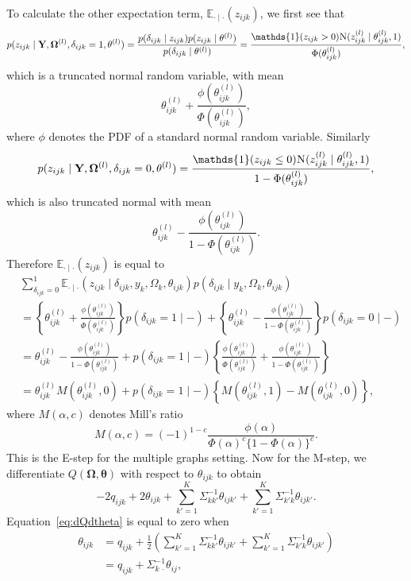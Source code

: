 \documentclass[a4paper, 11pt, oneside]{report}
\newcommand{\E}{\mathbb{E}}
\newcommand{\1}{\mathds{1}}
\newcommand{\powl}{^{(l)}}
\newcommand{\inv}{^{-1}}
\newcommand{\Nor}{\textsc{N}}
\newcommand{\bOmega}{\mathbf{\Omega}}
\newcommand{\btheta}{\mathbf{\theta}}
\newcommand{\tijkl}{\theta_{ijk}\powl}
\newcommand{\bY}{\mathbf{Y}}
\begin{document}
To calculate the other expectation term, $\E_{\cdot \mid \cdot}(z_{ijk})$, we
first see that
\[
	p(z_{ijk} \mid \bY, \bOmega\powl, \delta_{ijk} = 1, \btheta\powl) =
	\frac{p(\delta_{ijk} \mid z_{ijk})p(z_{ijk} \mid
		\btheta\powl)}{p(\delta_{ijk} \mid \btheta\powl)} = \frac{\1(z_{ijk} > 0)
		\Nor(z_{ijk} \powl \mid \theta_{ijk}\powl, 1)}{\Phi(\theta_{ijk}\powl)},
\]
which is a truncated normal random variable, with mean
\[\theta_{ijk}\powl + \frac{\phi(\theta_{ijk}\powl)}{\Phi(\theta_{ijk}\powl)},\]
where $\phi$ denotes the PDF of a standard normal random variable.
Similarly
\[
	p(z_{ijk} \mid \bY, \bOmega\powl, \delta_{ijk} = 0, \btheta\powl)
	=\frac{\1(z_{ijk} \leq 0) \Nor(z_{ijk} \powl \mid \theta_{ijk}\powl, 1)}{1
		- \Phi(\theta_{ijk}\powl)},
\]
which is also truncated normal with mean
\[
	\theta_{ijk}\powl - \frac{\phi(\theta_{ijk}\powl)}{1 - \Phi(\theta_{ijk}\powl)}.
\]
Therefore $\E_{\cdot \mid \cdot}(z_{ijk})$ is equal to
\begin{align*}
	 & \sum_{\delta_{ijk} = 0}^1 \E_{\cdot \mid
		\cdot}\left(z_{ijk} \mid \delta_{ijk}, y_k, \Omega_k, \theta_{ijk}\right)
	p(\delta_{ijk} \mid y_k, \Omega_k, \theta_{ijk})                               \\
	 & = \left\{\tijkl +
	\frac{\phi(\tijkl)}{\Phi(\tijkl)}\right\}
	p(\delta_{ijk} = 1 \mid -) + \left\{\theta_{ijk}\powl -
	\frac{\phi(\theta_{ijk}\powl)}{1 -
	\Phi(\theta_{ijk}\powl)}\right\}p(\delta_{ijk} = 0 \mid -) \label{eq:expect-z} \\
	 & = \tijkl - \frac{\phi(\tijkl)}{1 - \Phi(\tijkl)} + p(\delta_{ijk} = 1
	\mid -) \left\{\frac{\phi(\tijkl)}{\Phi(\tijkl)} + \frac{\phi(\tijkl)}{1
	- \Phi(\tijkl)}\right\}                                                        \\
	 & = \tijkl M\left(\tijkl, 0\right) + p(\delta_{ijk} = 1 \mid
	-)\left\{M\left(\tijkl, 1\right) -
	M\left(\tijkl, 0\right)\right\},
\end{align*}
where $M(\alpha, c)$ denotes Mill's ratio
\[
	M(\alpha, c) = (-1)^{1-c}\frac{\phi(\alpha)}{\Phi(\alpha)^c \{1 - \Phi(\alpha)\}^c}.
\]
This is the E-step for the multiple graphs setting.
Now for the M-step, we differentiate $Q(\bOmega, \btheta)$ with respect to
$\theta_{ijk}$ to obtain
\begin{equation}\label{eq:dQdtheta}
	-2 q_{ijk} + 2 \theta_{ijk} + \sum_{k' = 1}^K \Sigma_{k k'}\inv \theta_{ijk'} + \sum_{k' = 1}^K \Sigma_{k' k}\inv \theta_{ijk'}.
\end{equation}
Equation~\eqref{eq:dQdtheta} is equal to
zero when
\begin{align*}
	\theta_{ijk} & = q_{ijk} + \frac{1}{2}\left(\sum_{k' = 1}^K \Sigma_{k k'}\inv \theta_{ijk'} + \sum_{k' = 1}^K \Sigma_{k' k}\inv \theta_{ijk'}\right) \\
	             & = q_{ijk} + \Sigma_{k \, \cdot}\inv \theta_{ij},
\end{align*}
\end{document}
